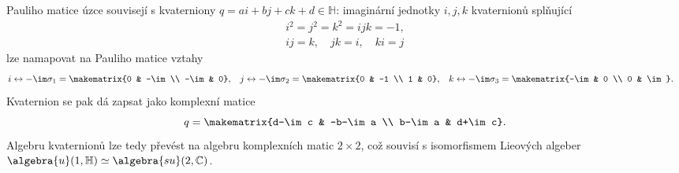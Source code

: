 Pauliho matice úzce souvisejí s kvaterniony $q=ai+bj+ck+d\in\mathbb{H}$: imaginární jednotky $i,j,k$ kvaternionů splňující
\begin{subequations}
    \begin{align}
        i^2=j^2=k^2=ijk=-1,\\
        ij=k,\quad
        jk=i,\quad
        ki=j
    \end{align}        
\end{subequations}
lze namapovat na Pauliho matice vztahy
\begin{align}
    i&\leftrightarrow-\im\sigma_{1}=\makematrix{0 & -\im \\ -\im & 0},
    &j&\leftrightarrow-\im\sigma_{2}=\makematrix{0 & -1 \\ 1 & 0},
    &k&\leftrightarrow-\im\sigma_{3}=\makematrix{-\im & 0 \\ 0 & \im}.
\end{align}
Kvaternion se pak dá zapsat jako komplexní matice
\begin{equation}
    q=\makematrix{d-\im c & -b-\im a \\ b-\im a & d+\im c}.
\end{equation}
Algebru kvaternionů lze tedy převést na algebru komplexních matic $2\times2$, což souvisí s isomorfismem Lieových algeber $\algebra{u}(1,\mathbb{H})\simeq\algebra{su}(2,\mathbb{C})$.